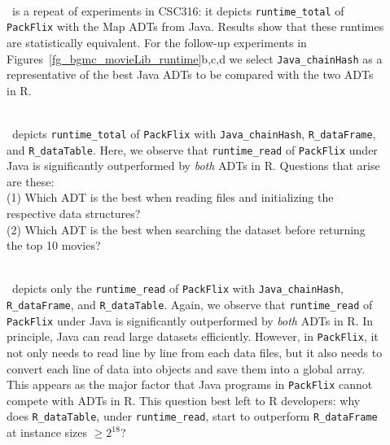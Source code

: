 \begin{description}

\item[]~\\\
is a repeat of  experiments in CSC316:
it depicts {\tt runtime\_total} of {\tt PackFlix} with the Map ADTs from Java. 
Results show that these runtimes are statistically equivalent. 
For the follow-up experiments in
Figures~\ref{fg_bgmc_movieLib_runtime}b,c,d
we select 
{\tt Java\_chainHash} as a representative of the best Java ADTs to be compared with the two  ADTs in R.


\item[]~\\\
depicts {\tt runtime\_total} of {\tt PackFlix} with 
{\tt Java\_chainHash},
{\tt R\_dataFrame}, and 
{\tt R\_dataTable}. 
Here, we observe that {\tt runtime\_read} of {\tt PackFlix} under Java is 
significantly outperformed by {\it both} ADTs in R.
Questions that arise are these:\\
(1) Which ADT is the best when reading files and initializing the respective data structures?\\
(2) Which ADT is the best when searching the dataset before returning the top 10 movies?

\item[]~\\\
depicts only the {\tt runtime\_read} of {\tt PackFlix} with 
{\tt Java\_chainHash},
{\tt R\_dataFrame}, and 
{\tt R\_dataTable}. 
Again, we observe that {\tt runtime\_read} of {\tt PackFlix} under Java is 
significantly outperformed by {\it both} ADTs in R.
In principle, Java can read large datasets efficiently. 
However, in {\tt PackFlix}, it not only needs to read line by line from each data files, 
but it also needs to convert each line of data into objects and save them into a global array. This appears as the major factor that Java programs in {\tt PackFlix} cannot compete with ADTs in R. 
This question best left to R developers:
why does {\tt R\_dataTable}, under  {\tt runtime\_read},
start to outperform {\tt R\_dataFrame} at 
instance sizes $\ge 2^{18}$?


\end{description}
